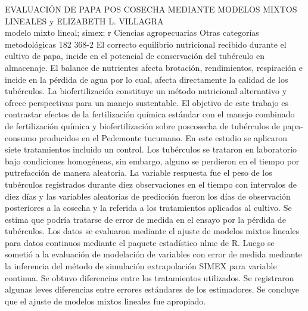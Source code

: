 \A
{EVALUACIÓN DE PAPA POS COSECHA MEDIANTE MODELOS MIXTOS LINEALES}
{ y ELIZABETH L. VILLAGRA}
{
\\}
{modelo mixto lineal; simex; r} 
 {Ciencias agropecuarias} 
 {Otras categorías metodológicas} 
 {182} 
 {368-2}
{El correcto equilibrio nutricional recibido durante el cultivo de papa, incide en el potencial de conservación del tubérculo en almacenaje. El balance de nutrientes afecta brotación, rendimientos, respiración e incide en la pérdida de agua por lo cual, afecta directamente la calidad de los tubérculos. La biofertilización constituye un método nutricional alternativo y ofrece perspectivas para un manejo sustentable. El objetivo de este trabajo es contrastar efectos de la fertilización química estándar con el manejo combinado de fertilización química y biofertilización sobre poscosecha de tubérculos de papa-consumo producidos en el Pedemonte tucumano. En este estudio se aplicaron siete tratamientos incluido un control. Los tubérculos se trataron en laboratorio bajo condiciones homogéneas, sin embargo, alguno se perdieron en el tiempo por putrefacción de manera aleatoria. La variable respuesta fue el peso de los tubérculos registrados durante diez observaciones en el tiempo con intervalos de diez días y las variables aleatorias de predicción fueron los días de observación posteriores a la cosecha y la referida a los tratamientos aplicados al cultivo. Se estima que podría tratarse de error de medida en el ensayo por la pérdida de tubérculos. Los datos se evaluaron mediante el ajuste de modelos mixtos lineales para datos continuos mediante el paquete estadístico nlme de R. Luego se sometió a la evaluación de modelación de variables con error de medida mediante la inferencia del método de simulación extrapolación SIMEX para variable continua. Se obtuvo diferencias entre los tratamientos utilizados. Se registraron algunas leves diferencias entre errores estándares de los estimadores. Se concluye que el ajuste de modelos mixtos lineales fue apropiado.}

